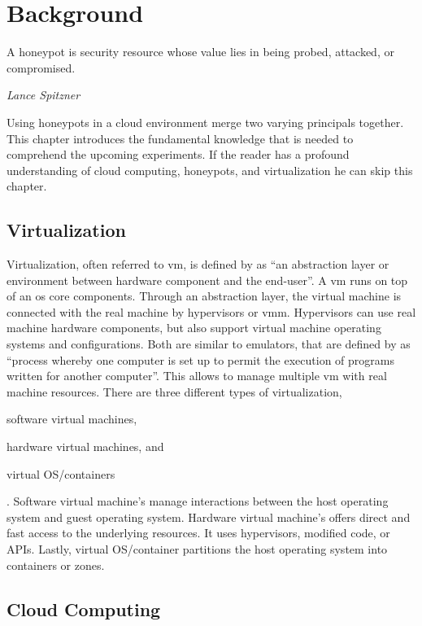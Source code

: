 \chapter{Background}

\epigraph{A honeypot is security resource whose value lies in being probed, attacked, or compromised.}{\textit{Lance Spitzner}}

Using honeypots in a cloud environment merge two varying principals together.
This chapter introduces the fundamental knowledge that is needed to comprehend the upcoming experiments.
If the reader has a profound understanding of cloud computing, honeypots, and virtualization he can skip this chapter.

\section{Virtualization}

Virtualization, often referred to \ac{vm}, is defined by \citet{kreuter2004} as \enquote{an abstraction layer or environment between hardware component and the end-user}.
A \ac{vm} runs on top of an \ac{os} core components.
Through an abstraction layer, the virtual machine is connected with the real machine by hypervisors or \ac{vmm}.
Hypervisors can use real machine hardware components, but also support virtual machine operating systems and configurations.
Both are similar to emulators, that are defined by \citet{lichstei1969} as \enquote{process whereby one computer is set up to permit the execution of programs written for another computer}.
This allows to manage multiple \ac{vm} with real machine resources.
There are three different types of virtualization,
\begin{enumerate*}[label=(\roman*)]
    \item software virtual machines,
    \item hardware virtual machines, and
    \item virtual OS/containers
\end{enumerate*}.
Software virtual machine's manage interactions between the host operating system and guest operating system.
Hardware virtual machine's offers direct and fast access to the underlying resources.
It uses hypervisors, modified code, or APIs.
Lastly, virtual OS/container partitions the host operating system into containers or zones.
\cite{daniels2009}

\section{Cloud Computing}
\label{sec:cloud-computing}

